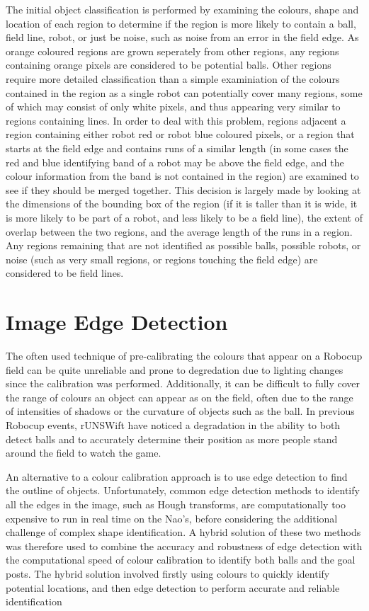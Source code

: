 \documentclass[runningheads,a4paper]{llncs}
\begin{document}
The initial object classification is performed by examining the colours, shape and location of each region to determine if the region is more likely to contain a ball, field line, robot, or just be noise, such as noise from an error in the field edge. As orange coloured regions are grown seperately from other regions, any regions containing orange pixels are considered to be potential balls. Other regions require more detailed classification than a simple examiniation of the colours contained in the region as a single robot can potentially cover many regions, some of which may consist of only white pixels, and thus appearing very similar to regions containing lines. In order to deal with this problem, regions adjacent a region containing either robot red or robot blue coloured pixels, or a region that starts at the field edge and contains runs of a similar length (in some cases the red and blue identifying band of a robot may be above the field edge, and the colour information from the band is not contained in the region) are examined to see if they should be merged together. This decision is largely made by looking at the dimensions of the bounding box of the region (if it is taller than it is wide, it is more likely to be part of a robot, and less likely to be a field line), the extent of overlap between the two regions, and the average length of the runs in a region. Any regions remaining that are not identified as possible balls, possible robots, or noise (such as very small regions, or regions touching the field edge) are considered to be field lines.

\section{Image Edge Detection}

The often used technique of pre-calibrating the colours that appear on a Robocup field can be quite unreliable and prone to degredation due to lighting changes since the calibration was performed. Additionally, it can be difficult to fully cover the range of colours an object can appear as on the field, often due to the range of intensities of shadows or the curvature of objects such as the ball. In previous Robocup events, rUNSWift have noticed a degradation in the ability to both detect balls and to accurately determine their position as more people stand around the field to watch the game.

An alternative to a colour calibration approach is to use edge detection to find the outline of objects. Unfortunately, common edge detection methods to identify all the edges in the image, such as Hough transforms, are computationally too expensive to run in real time on the Nao's, before considering the additional challenge of complex shape identification. A hybrid solution of these two methods was therefore used to combine the accuracy and robustness of edge detection with the computational speed of colour calibration to identify both balls and the goal posts. The hybrid solution involved firstly using colours to quickly identify potential locations, and then edge detection to perform accurate and reliable identification
\end{document}
